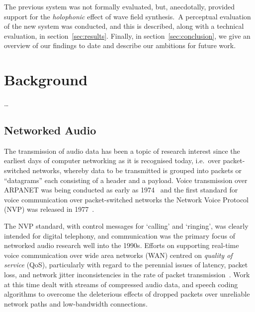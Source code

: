 \documentclass[utf8]{FrontiersinHarvard}
\newcommand{\secref}[1]{section~\ref{#1}}
\begin{document}
    The previous system was not formally evaluated, but, anecdotally, provided
    support for the \textit{holophonic} effect of wave field synthesis.\
    A perceptual evaluation of the new system was conducted, and this is
    described, along with a technical evaluation, in \secref{sec:results}.
    Finally, in \secref{sec:conclusion}, we give an overview of our findings to
    date and describe our ambitions for future work.

    \section{Background}\label{sec:background}

    \dots

    \subsection{Networked Audio}\label{subsec:networked-audio}

    The transmission of audio data has been a topic of research interest since the
    earliest days of computer networking as it is recognised today, i.e.\ over
    packet-switched networks, whereby data to be transmitted is grouped into
    packets \textemdash{} or ``datagrams'' \textemdash{} each consisting of a header
    and a payload.
    Voice transmission over ARPANET was being conducted as early as
    1974~\citep{schulzrinne_voice_1992} and the first standard for voice
    communication over packet-switched networks \textemdash{} the Network Voice
    Protocol (NVP) \textemdash{} was released in
    1977~\citep{cohen_specifications_1977}.

    The NVP standard, with control messages for `calling' and `ringing', was
    clearly intended for digital telephony, and communication was the primary
    focus of networked audio research well into the 1990s.
    Efforts on supporting real-time voice communication over wide area networks
    (WAN) centred on \textit{quality of service} (QoS), particularly with regard
    to the perennial issues of latency, packet loss, and network jitter
    \textemdash{} inconsistencies in the rate of packet
    transmission~\citep{hardman_reliable_1995,hardman_successful_1998}.
    Work at this time dealt with streams of compressed audio data, and speech
    coding algorithms to overcome the deleterious effects of dropped packets
    over unreliable network paths and low-bandwidth connections.
\end{document}
